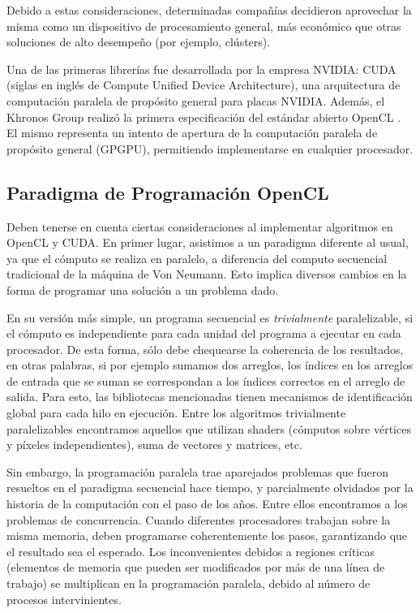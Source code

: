 Debido a estas consideraciones, determinadas compañías decidieron aprovechar la misma como un dispositivo de procesamiento general, más económico que otras soluciones de alto desempeño (por ejemplo, clústers).


Una de las primeras librerías fue desarrollada por la empresa NVIDIA: \acrshort{CUDA} (siglas en ingl\'es de Compute Unified Device Architecture), una arquitectura de computaci\'on paralela de prop\'osito general para placas NVIDIA.
Además, el Khronos Group realizó la primera especificación del estándar abierto OpenCL \cite{Stone2010}.
El mismo representa un intento de apertura de la computación paralela de propósito general (GPGPU), permitiendo implementarse en cualquier procesador.

\subsection{Paradigma de Programación OpenCL}
Deben tenerse en cuenta ciertas consideraciones al implementar algoritmos en OpenCL y CUDA.
En primer lugar, asistimos a un paradigma diferente al usual, ya que el cómputo se realiza en paralelo, a diferencia del computo secuencial tradicional de la máquina de Von Neumann.
Esto implica diversos cambios en la forma de programar una solución a un problema dado.

En su versión más simple, un programa secuencial es {\em trivialmente} paralelizable, si el cómputo es independiente para cada unidad del programa a ejecutar en cada procesador.
De esta forma, sólo debe chequearse la coherencia de los resultados, en otras palabras, si por ejemplo sumamos dos arreglos, los índices en los arreglos de entrada que se suman se correspondan a los índices correctos en el arreglo de salida.
Para esto, las bibliotecas mencionadas tienen mecanismos de identificación global para cada hilo en ejecución.
Entre los algoritmos trivialmente paralelizables encontramos aquellos que utilizan shaders (cómputos sobre vértices y píxeles independientes), suma de vectores y matrices, etc.

Sin embargo, la programación paralela trae aparejados problemas que fueron resueltos en el paradigma secuencial hace tiempo, y parcialmente olvidados por la historia de la computación con el paso de los años.
Entre ellos encontramos a los problemas de concurrencia.
Cuando diferentes procesadores trabajan sobre la misma memoria, deben programarse coherentemente los pasos, garantizando que el resultado sea el esperado.
Los inconvenientes debidos a regiones críticas (elementos de memoria que pueden ser modificados por más de una línea de trabajo) se multiplican en la programación paralela, debido al número de procesos intervinientes.

